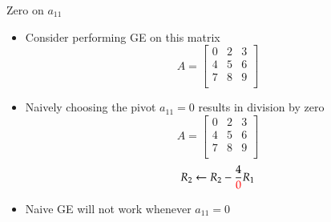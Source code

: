 \documentclass[10pt]{beamer}
\begin{document}
\begin{frame}{Zero on $a_{11}$}

\begin{itemize}
    \item Consider performing GE on this matrix
\begin{equation*}
A=
\begin{bmatrix}
  0 & 2 & 3\\
  4 & 5 & 6\\
  7 & 8 & 9\\
\end{bmatrix}
\end{equation*}
    \item Naively choosing the pivot $a_{11} = 0$ results in division by zero 
\begin{equation*}
A=
\begin{bmatrix}
  \boxed{0} & 2 & 3\\
  4 & 5 & 6\\
  7 & 8 & 9\\
\end{bmatrix}
\end{equation*}
$$
R_2 \leftarrow R_2 - \frac{4}{\textcolor{red}{0}} R_1
$$
\item Naive GE will not work whenever $a_{11} = 0$
\end{itemize}
\end{frame}

\end{document}
